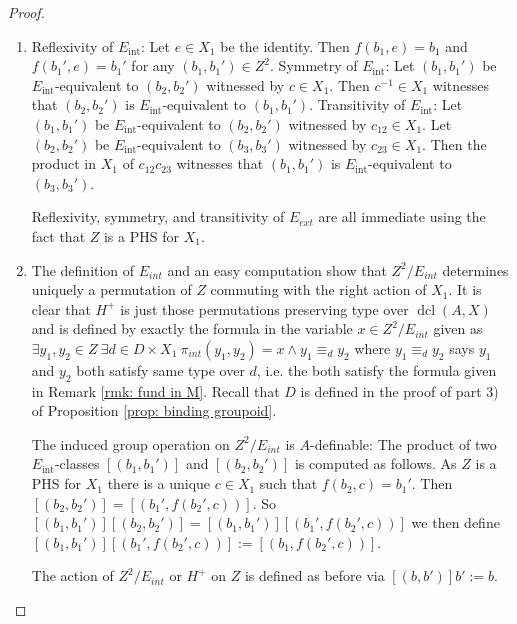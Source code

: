 \documentclass{amsart}
\theoremstyle{definition}
\theoremstyle{remark}
\numberwithin{equation}{section}
\def \aut {\text{Aut}}
\def \dcl {\operatorname{dcl}}
\begin{document}
\begin{proof}
    \begin{enumerate}
        \item Reflexivity of $E_{\text{int}}$: Let $e \in X_1$ be the identity. Then $f(b_1,e) = b_1$ and $f(b_1',e) = b_1'$ for any $(b_1,b_1') \in Z^2$. Symmetry of $E_{\text{int}}$: Let $(b_1,b_1')$ be $E_{\text{int}}$-equivalent to $(b_2,b_2')$ witnessed by $c \in X_1$. Then $c^{-1} \in X_1$ witnesses that $(b_2,b_2')$ is $E_{\text{int}}$-equivalent to $(b_1,b_1')$. Transitivity of $E_{\text{int}}$: Let $(b_1,b_1')$ be $E_{\text{int}}$-equivalent to $(b_2,b_2')$ witnessed by $c_{12} \in X_1$. Let $(b_2,b_2')$ be $E_{\text{int}}$-equivalent to $(b_3,b_3')$ witnessed by $c_{23} \in X_1$. Then the product in $X_1$ of $c_{12}c_{23}$ witnesses that $(b_1,b_1')$ is $E_{\text{int}}$-equivalent to $(b_3,b_3')$.

        Reflexivity, symmetry, and transitivity of $E_{ext}$ are all immediate using the fact that $Z$ is a PHS for $X_1$.

        \item The definition of $E_{int}$ and an easy computation show that $Z^2/E_{int}$ determines uniquely a permutation of $Z$ commuting with the right action of $X_1$. It is clear that $H^+$ is just those permutations preserving type over $\dcl(A,X)$ and is defined by exactly the formula in the variable $x\in Z^2/E_{int}$ given as $\exists y_1,y_2 \in Z \  \exists d \in D \times X_1\ \pi_{int}(y_1,y_2) = x \wedge y_1 \equiv_d y_2$ where $y_1 \equiv_d y_2$ says $y_1$ and $y_2$ both satisfy same type over $d$, i.e. the both satisfy the formula given in Remark \ref{rmk: fund in M}. Recall that $D$ is defined in the proof of part 3) of Proposition \ref{prop: binding groupoid}.

        The induced group operation on $Z^2/E_{int}$ is $A$-definable: The product of two $E_{\text{int}}$-classes $[(b_1,b_1')]$ and $[(b_2,b_2')]$ is computed as follows. As $Z$ is a PHS for $X_1$ there is a unique $c \in X_1$ such that $f(b_2,c) = b_1'$. Then $[(b_2,b_2')] = [(b_1',f(b_2',c))]$. So $[(b_1,b_1')][(b_2,b_2')] = [(b_1,b_1')][(b_1',f(b_2',c))]$ we then define $[(b_1,b_1')][(b_1',f(b_2',c))] := [(b_1,f(b_2',c))]$.

        The action of $Z^2/E_{int}$ or $H^+$ on $Z$ is defined as before via $[(b,b')]b' := b$.

        
        

\end{enumerate}
\end{proof}
\end{document}

